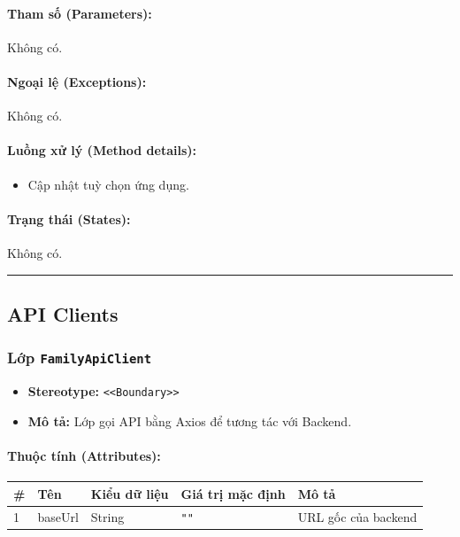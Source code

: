 \documentclass[12pt,a4paper]{article}
\begin{document}
\paragraph{Tham số (Parameters):}
Không có.

\paragraph{Ngoại lệ (Exceptions):}
Không có.

\paragraph{Luồng xử lý (Method details):}
\begin{itemize}[leftmargin=*]
    \item Cập nhật tuỳ chọn ứng dụng.
\end{itemize}


\paragraph{Trạng thái (States):}
Không có.

\vskip 0.5cm
\noindent\rule{\textwidth}{0.5pt}
\vskip 0.5cm

\subsection{API Clients}


\subsubsection{Lớp \texttt{FamilyApiClient}}

\begin{itemize}[leftmargin=*]
    \item \textbf{Stereotype:} \texttt{\textless{}\textless{}Boundary\textgreater{}\textgreater{}}
    \item \textbf{Mô tả:} Lớp gọi API bằng Axios để tương tác với Backend.
\end{itemize}

\paragraph{Thuộc tính (Attributes):}
\begin{longtable}{|p{0.6cm}|p{3.5cm}|p{2.4cm}|p{1.8cm}|p{5.1cm}|}
\hline
\textbf{\#} & \textbf{Tên} & \textbf{Kiểu dữ liệu} & \textbf{Giá trị mặc định} & \textbf{Mô tả} \\ \hline
\endhead
1 & baseUrl & String & \texttt{""} & URL gốc của backend \\ \hline
\end{longtable}
\end{document}

